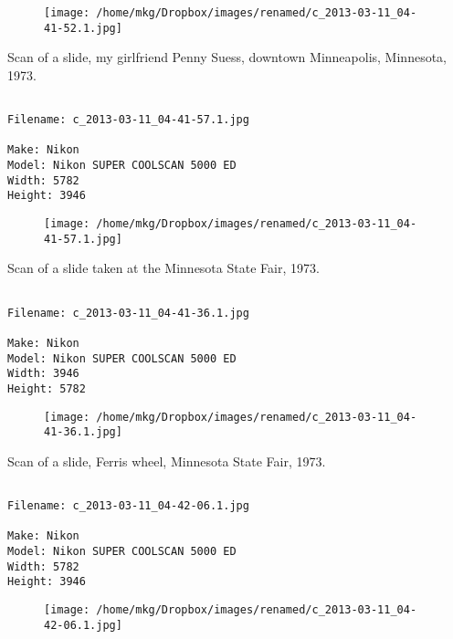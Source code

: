 \begin{figure}
\texttt{[image: /home/mkg/Dropbox/images/renamed/c\_2013-03-11\_04-41-52.1.jpg]}
\end{figure}
    
\clearpage
\onecolumn
\noindent Scan of a slide, my girlfriend Penny Suess, downtown Minneapolis, Minnesota, 1973.
\noindent
\begin{lstlisting}

Filename: c_2013-03-11_04-41-57.1.jpg

Make: Nikon
Model: Nikon SUPER COOLSCAN 5000 ED
Width: 5782
Height: 3946
\end{lstlisting}
\clearpage

\begin{figure}
\texttt{[image: /home/mkg/Dropbox/images/renamed/c\_2013-03-11\_04-41-57.1.jpg]}
\end{figure}
    
\clearpage
\onecolumn
\noindent Scan of a slide taken at the Minnesota State Fair, 1973.
\noindent
\begin{lstlisting}

Filename: c_2013-03-11_04-41-36.1.jpg

Make: Nikon
Model: Nikon SUPER COOLSCAN 5000 ED
Width: 3946
Height: 5782
\end{lstlisting}
\clearpage

\begin{figure}
\texttt{[image: /home/mkg/Dropbox/images/renamed/c\_2013-03-11\_04-41-36.1.jpg]}
\end{figure}
    
\clearpage
\onecolumn
\noindent Scan of a slide, Ferris wheel, Minnesota State Fair, 1973.
\noindent
\begin{lstlisting}

Filename: c_2013-03-11_04-42-06.1.jpg

Make: Nikon
Model: Nikon SUPER COOLSCAN 5000 ED
Width: 5782
Height: 3946
\end{lstlisting}
\clearpage

\begin{figure}
\texttt{[image: /home/mkg/Dropbox/images/renamed/c\_2013-03-11\_04-42-06.1.jpg]}
\end{figure}
    
